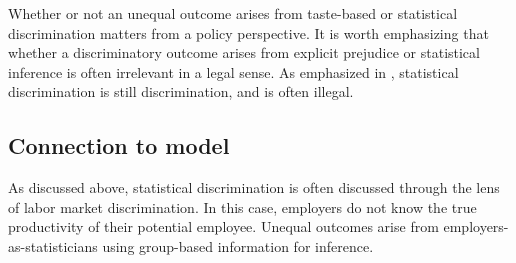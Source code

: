 Whether or not an unequal outcome arises from taste-based or statistical discrimination matters from a policy perspective.
It is worth emphasizing that whether a discriminatory outcome arises from explicit prejudice or statistical inference is often irrelevant in a legal sense.
As emphasized in \textcite{LS83}, statistical discrimination is still discrimination, and is often illegal.




\subsection{Connection to model}

As discussed above, statistical discrimination is often discussed through the lens of labor market discrimination. In this case, employers do not know the true productivity of their potential employee. Unequal outcomes arise from employers-as-statisticians using group-based information for inference.


